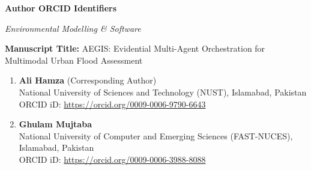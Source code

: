 \documentclass[11pt,a4paper]{article}
\begin{document}
\thispagestyle{empty}

\begin{center}
{\Large \bf Author ORCID Identifiers \par}
\vspace{0.5em}
{\large \textit{Environmental Modelling \& Software} \par}
\end{center}

\vspace{2em}

\noindent \textbf{Manuscript Title:} AEGIS: Evidential Multi-Agent Orchestration for Multimodal Urban Flood Assessment

\vspace{2em}

\begin{enumerate}[leftmargin=*,itemsep=1.5em]
    \item \textbf{Ali Hamza} (Corresponding Author) \\
    National University of Sciences and Technology (NUST), Islamabad, Pakistan \\
    ORCID iD: \href{https://orcid.org/0009-0006-9790-6643}{https://orcid.org/0009-0006-9790-6643}

    \item \textbf{Ghulam Mujtaba} \\
    National University of Computer and Emerging Sciences (FAST-NUCES), Islamabad, Pakistan \\
    ORCID iD: \href{https://orcid.org/0009-0006-3988-8088}{https://orcid.org/0009-0006-3988-8088}
\end{enumerate}
\end{document}
